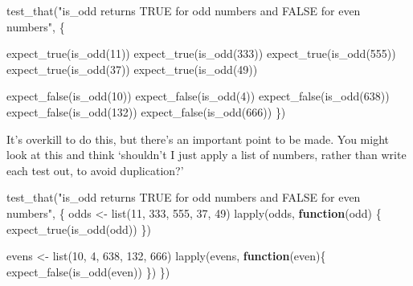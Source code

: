 \documentclass[
  letterpaper,
  DIV=11,
  numbers=noendperiod]{scrreprt}
\newenvironment{Shaded}{\begin{snugshade}}{\end{snugshade}}
\newcommand{\ControlFlowTok}[1]{\textcolor[rgb]{0.00,0.23,0.31}{\textbf{#1}}}
\newcommand{\DecValTok}[1]{\textcolor[rgb]{0.68,0.00,0.00}{#1}}
\newcommand{\FunctionTok}[1]{\textcolor[rgb]{0.28,0.35,0.67}{#1}}
\newcommand{\NormalTok}[1]{\textcolor[rgb]{0.00,0.23,0.31}{#1}}
\newcommand{\OtherTok}[1]{\textcolor[rgb]{0.00,0.23,0.31}{#1}}
\newcommand{\StringTok}[1]{\textcolor[rgb]{0.13,0.47,0.30}{#1}}
\begin{document}
\begin{Shaded}
\begin{Highlighting}[]
\FunctionTok{test\_that}\NormalTok{(}\StringTok{"is\_odd returns TRUE for odd numbers and FALSE for even numbers"}\NormalTok{, \{}
    
  \FunctionTok{expect\_true}\NormalTok{(}\FunctionTok{is\_odd}\NormalTok{(}\DecValTok{11}\NormalTok{))}
  \FunctionTok{expect\_true}\NormalTok{(}\FunctionTok{is\_odd}\NormalTok{(}\DecValTok{333}\NormalTok{))}
  \FunctionTok{expect\_true}\NormalTok{(}\FunctionTok{is\_odd}\NormalTok{(}\DecValTok{555}\NormalTok{))}
  \FunctionTok{expect\_true}\NormalTok{(}\FunctionTok{is\_odd}\NormalTok{(}\DecValTok{37}\NormalTok{))}
  \FunctionTok{expect\_true}\NormalTok{(}\FunctionTok{is\_odd}\NormalTok{(}\DecValTok{49}\NormalTok{))}
  
  
  \FunctionTok{expect\_false}\NormalTok{(}\FunctionTok{is\_odd}\NormalTok{(}\DecValTok{10}\NormalTok{))}
  \FunctionTok{expect\_false}\NormalTok{(}\FunctionTok{is\_odd}\NormalTok{(}\DecValTok{4}\NormalTok{))}
  \FunctionTok{expect\_false}\NormalTok{(}\FunctionTok{is\_odd}\NormalTok{(}\DecValTok{638}\NormalTok{))}
  \FunctionTok{expect\_false}\NormalTok{(}\FunctionTok{is\_odd}\NormalTok{(}\DecValTok{132}\NormalTok{))}
  \FunctionTok{expect\_false}\NormalTok{(}\FunctionTok{is\_odd}\NormalTok{(}\DecValTok{666}\NormalTok{))}
\NormalTok{\})}
\end{Highlighting}
\end{Shaded}

It's overkill to do this, but there's an important point to be made. You
might look at this and think `shouldn't I just apply a list of numbers,
rather than write each test out, to avoid duplication?'

\begin{Shaded}
\begin{Highlighting}[]
\FunctionTok{test\_that}\NormalTok{(}\StringTok{"is\_odd returns TRUE for odd numbers and FALSE for even numbers"}\NormalTok{, \{}
\NormalTok{  odds }\OtherTok{\textless{}{-}} \FunctionTok{list}\NormalTok{(}\DecValTok{11}\NormalTok{, }\DecValTok{333}\NormalTok{, }\DecValTok{555}\NormalTok{, }\DecValTok{37}\NormalTok{, }\DecValTok{49}\NormalTok{)}
  \FunctionTok{lapply}\NormalTok{(odds, }\ControlFlowTok{function}\NormalTok{(odd) \{}
    \FunctionTok{expect\_true}\NormalTok{(}\FunctionTok{is\_odd}\NormalTok{(odd))}
\NormalTok{  \})}
  
\NormalTok{  evens }\OtherTok{\textless{}{-}} \FunctionTok{list}\NormalTok{(}\DecValTok{10}\NormalTok{, }\DecValTok{4}\NormalTok{, }\DecValTok{638}\NormalTok{, }\DecValTok{132}\NormalTok{, }\DecValTok{666}\NormalTok{)}
  \FunctionTok{lapply}\NormalTok{(evens, }\ControlFlowTok{function}\NormalTok{(even)\{}
    \FunctionTok{expect\_false}\NormalTok{(}\FunctionTok{is\_odd}\NormalTok{(even))}
\NormalTok{  \})}
\NormalTok{\})}
\end{Highlighting}
\end{Shaded}
\end{document}
